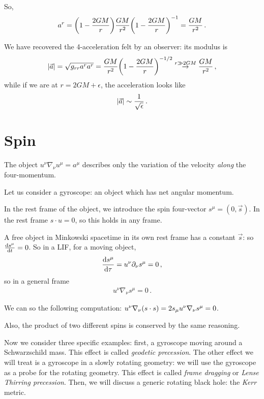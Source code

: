 \documentclass[main.tex]{subfiles}
\begin{document}
So, 
%
\begin{align}
  a^{r} = \qty(1 - \frac{2GM}{r}) \frac{GM}{r^2} \qty(1 - \frac{2GM}{r})^{-1} = \frac{GM}{r^2}
\,.
\end{align}

We have recovered the 4-acceleration felt by an observer: its modulus is 
%
\begin{align}
  \abs{\vec{a}} = \sqrt{g_{rr} a^{r} a^{r}} = \frac{GM}{r^2} \qty(1 - \frac{2GM}{r})^{-1/2} \overset{r \gg 2GM}{\rightarrow} \frac{GM}{r^2}
\,,
\end{align}
% 
while if we are at \(r = 2GM + \epsilon \), the acceleration looks like 
%
\begin{align}
  \abs{\vec{a}} \sim \frac{1}{\sqrt{ \epsilon }}
\,.
\end{align}

\section{Spin}

The object \(u^{\nu } \nabla_{\nu } u^{\mu  } = a^{\mu } \) describes only the variation of the velocity \emph{along} the four-momentum. 

Let us consider a gyroscope: an object which has net angular momentum. 

In the rest frame of the object, we introduce the spin four-vector \(s^{\mu } = (0, \vec{s})\). 
In the rest frame \(s \cdot u = 0\), so this holds in any frame. 

A free object in Minkowski spacetime in its own rest frame has a constant \(\vec{s}\): so \(\dv{s^{\mu }}{t} = 0\). 
So in a LIF, for a moving object, 
%
\begin{align}
  \dv{s^{\mu }}{\tau } = u^{\nu } \partial_{\nu } s^{\mu } = 0
\,,
\end{align}
%
so in a general frame 
%
\begin{align}
  u^{\nu } \nabla_{\nu } s^{\mu } = 0
\,.
\end{align}

We can so the following computation: \( u^{\nu } \nabla_{\nu } \qty(s \cdot s )= 2 s_{\mu } u^{\nu } \nabla_{\nu } s^{\mu } = 0\). 

Also, the product of two different spins is conserved by the same reasoning. 

Now we consider three specific examples: first, a gyroscope moving around a Schwarzschild mass. 
This effect is called \emph{geodetic precession}. 
The other effect we will treat is a gyroscope in a slowly rotating geometry: we will use the gyroscope as a probe for the rotating geometry.
This effect is called \emph{frame dragging} or \emph{Lense Thirring precession}. 
Then, we will discuss a generic rotating black hole: the \emph{Kerr} metric. 
\end{document}
